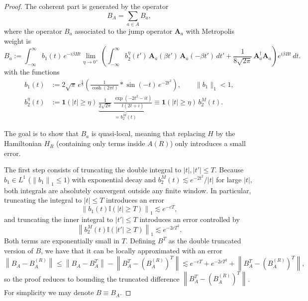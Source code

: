 \documentclass[11pt]{article}
\numberwithin{equation}{section}
\numberwithin{figure}{section}
\numberwithin{table}{section}
\theoremstyle{definition}
\theoremstyle{plain}
\theoremstyle{remark}
\newcommand{\Id}{\mathbb{I}}
\newcommand{\vA}{\bm{A}}
\newcommand{\norm}[1]{\left\lVert#1\right\rVert}
\newcommand{\normm}[2]{\left\lVert#1\right\rVert_{#2}}
\newcommand{\abs}[1]{\left \vert#1\right\vert}
\begin{document}
\begin{proof}
The coherent part is generated by the operator\[B_A=\sum_{a\in A}B_a,\]where the operator $B_a$ associated to the jump operator $\vA_a$ with Metropolis weight is
\begin{equation}
B_{a}
:=
\int_{-\infty}^{\infty}
b_1(t)\,
e^{-i\beta H t}
\lim_{\eta\to 0^+}
\left(
\int_{-\infty}^{\infty}
b_2^{\eta}(t')\,
\vA_{a}(\beta t')\,
\vA_{a}(-\beta t')\,dt'
+
\frac{1}{8\sqrt{2\pi}}\,
\vA_{a}^{\dagger}\vA_{a}
\right)
e^{i\beta H t}\,dt.
\end{equation}
with the functions
\begin{align}
b_1(t)
&:=
2\sqrt{\pi}\,e^{\frac18}
\left(
\frac{1}{\cosh(2\pi t)}
*
\sin(-t)\,e^{-2t^2}
\right),
\qquad
\|b_1\|_1 < 1,
\\[1ex]
b_{2}^{\eta}(t)
&:=
\mathbf{1}(|t|\ge \eta)\,
\underbrace{\frac{1}{2\sqrt{2\pi}}\,
\frac{\exp(-2t^2-it)}{t(2t+i)}}_{=b_2^M(t)}
\equiv
\mathbf{1}(|t|\ge \eta)\,
b_2^{M}(t).
\end{align}

    The goal is to show that $B_a$ is quasi-local, meaning that replacing $H$ by the Hamiltonian $H_R$ (containing only terms inside $A(R)$) only introduces a small error.

    The first step consists of truncating the double integral to $\abs{t},\abs{t'}\leq T$. Because $b_1\in L^1 $ ($\normm{b_1}{1}\leq 1$) with exponential decay and $b_2^M(t)\lesssim e^{-2t^2}/\abs{t}$ for large $\abs{t}$, both integrals are absolutely convergent outside any finite window. In particular, truncating the integral to $\abs{t}\leq T$ introduces an error
    \begin{equation}
        \normm{b_1(t) \Id(\abs{t}\geq T)}{1}\lesssim e^{-cT},
    \end{equation}
    and truncating the inner integral to $\abs{t'}\leq T$ introduces an error controlled by
    \begin{equation}
        \normm{b_2^M(t)\Id(\abs{t'}\geq T)}{1}\lesssim e^{-2cT^2}.
    \end{equation}
    Both terms are exponentially small in $T$. Defining $B^T$ as the double truncated version of $B$, we have that it can be locally approximated with an error
    \begin{equation}
        \normm{B_A-B_A^{(R)}}{}\leq \normm{B_A-B_A^T}{}-\norm{B_A^T-(B_A^{(R)})^T}\lesssim e^{-cT}+e^{-2cT^2}+\norm{B_A^T-(B_A^{(R)})^T},
    \end{equation}
    so the proof reduces to bounding the truncated difference $\normm{B_A^T-(B_A^{(R)})^T}{}$. For simplicity we may denote $B\equiv B_A$.


\end{proof}
\end{document}
